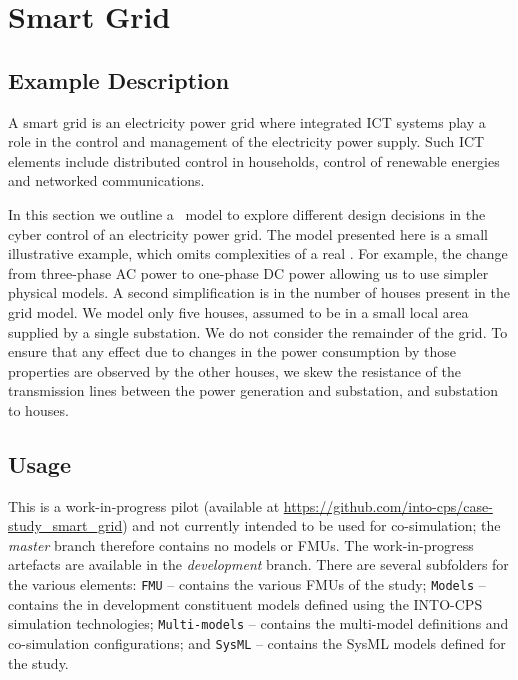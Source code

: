 \section{Smart Grid}
\label{sec:smartgrid}

\subsection{Example Description}
\label{sec:smartgrid_desc}

A smart grid is an electricity power grid where integrated ICT systems play a role in the control and management of the electricity power supply. 
Such ICT elements include distributed control in households, control of renewable energies and networked communications. 

In this section we outline a \SG\ model to explore different design decisions in the cyber control of an electricity power grid. The model presented here is a small illustrative example, which omits complexities of a real \SG. For example, the change from three-phase AC power to one-phase DC power allowing us to use simpler physical models. A second simplification is in the number of houses present in the grid model. We model only five houses, assumed to be in a small local area supplied by a single substation. We do not consider the remainder of the grid. To ensure that any effect due to changes in the power consumption by those properties are observed by the other houses, we skew the resistance of the transmission lines between the power generation and substation, and substation to houses. 


\subsection{Usage}
\label{sec:smartgrid_usage}

This is a work-in-progress pilot (available at \url{https://github.com/into-cps/case-study\_smart\_grid}) and not currently intended to be used for co-simulation; the \emph{master} branch therefore contains no models or FMUs. The work-in-progress artefacts are available in the \emph{development} branch. There are several subfolders for the various elements: \texttt{FMU} -- contains the various FMUs of the study; \texttt{Models} -- contains the in development constituent models defined using the INTO-CPS simulation technologies; \texttt{Multi-models} -- contains the multi-model definitions and co-simulation configurations; and \texttt{SysML} -- contains the SysML models defined for the study. 

